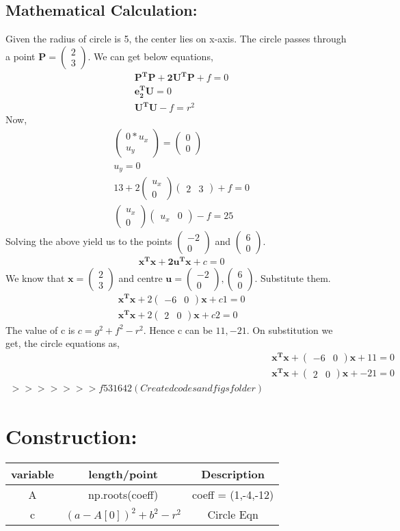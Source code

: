 \documentclass[a4paper,12pt,twocolumn]{article}
\let\vec\mathbf
\newcommand{\myvec}[1]{\ensuremath{\begin{pmatrix}#1\end{pmatrix}}}
\begin{document}
\subsection{Mathematical Calculation:}
Given the radius of circle is 5, the center lies on x-axis. The circle passes through a point $\vec{P} = \myvec{2\\3}$. We can get below equations,
\begin{align*}
	&\vec{P^TP} + \vec{2U^TP} + f = 0\\  
	&\vec{e_2^TU} = 0\\
	&\vec{U^TU} - f = r^2
\end{align*}
Now,
\begin{align}
	&\myvec{0*u_x\\u_y} = \myvec{0\\0}\\
	&u_y=0\\
	&13+2\myvec{u_x\\0}\myvec{2 &3}+f = 0\\
	&\myvec{u_x\\0}\myvec{u_x &0} - f = 25
\end{align}
Solving the above yield us to the points $\myvec{-2\\0}$ and $\myvec{6\\0}$.
\begin{align}
	&\vec{x^Tx} + \vec{2u^Tx} + c = 0
\end{align}
We know that $\vec{x} = \myvec{2\\3}$ and centre $\vec{u} = \myvec{-2\\0},\myvec{6\\0}$. Substitute them.
\begin{align}
	&\vec{x^Tx} + 2\myvec{-6 &0}\vec{x} + c1 = 0\\
	&\vec{x^Tx} + 2\myvec{2 &0}\vec{x} + c2 = 0
\end{align}
The value of c is $c = g^2+f^2-r^2$. Hence c can be $11,-21$. On substitution we get, the circle equations as,
\begin{align}
	&\vec{x^Tx} + \myvec{-6 &0}\vec{x} + 11 = 0\\
	&\vec{x^Tx} + \myvec{2 &0}\vec{x} + -21 = 0\\
>>>>>>> f531642 (Created codes and figs folder)
\end{align}
\section{Construction:}

\begin{table}[h]
        \centering
\setlength\extrarowheight{2pt}
        \begin{tabular}{|c|c|c|}
                \hline
                \textbf{variable} & \textbf{length/point} & \textbf{Description}\\
                \hline
		A & np.roots(coeff) & coeff = (1,-4,-12)\\
		\hline
		c & $(a-A[0])^2+b^2-r^2$ & Circle Eqn\\
		\hline
        \end{tabular}
\end{table}
\end{document}
